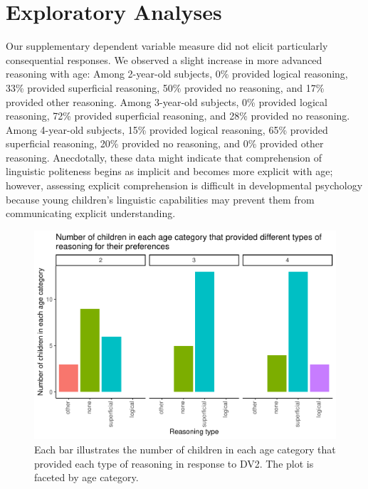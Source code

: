 \documentclass[
  english,
  man,floatsintext]{apa6}
\begin{document}
\newpage

\hypertarget{exploratory-analyses}{%
\section{Exploratory Analyses}\label{exploratory-analyses}}

Our supplementary dependent variable measure did not elicit particularly consequential responses. We observed a slight increase in more advanced reasoning with age: Among 2-year-old subjects, 0\% provided logical reasoning, 33\% provided superficial reasoning, 50\% provided no reasoning, and 17\% provided other reasoning. Among 3-year-old subjects, 0\% provided logical reasoning, 72\% provided superficial reasoning, and 28\% provided no reasoning. Among 4-year-old subjects, 15\% provided logical reasoning, 65\% provided superficial reasoning, 20\% provided no reasoning, and 0\% provided other reasoning. Anecdotally, these data might indicate that comprehension of linguistic politeness begins as implicit and becomes more explicit with age; however, assessing explicit comprehension is difficult in developmental psychology because young children's linguistic capabilities may prevent them from communicating explicit understanding.

\begin{figure}
\centering
\includegraphics{writeup_files/figure-latex/unnamed-chunk-3-1.pdf}
\caption{\label{fig:unnamed-chunk-3}Each bar illustrates the number of children in each age category that provided each type of reasoning in response to DV2. The plot is faceted by age category.}
\end{figure}
\end{document}
